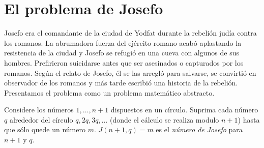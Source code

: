 
\section{El problema de Josefo}\label{s.josephus}

Josefo era el comandante de la ciudad de Yodfat durante la rebelión judía contra los romanos. La abrumadora fuerza del ejército romano acabó aplastando la resistencia de la ciudad y Josefo se refugió en una cueva con algunos de sus hombres. Prefirieron suicidarse antes que ser asesinados o capturados por los romanos. Según el relato de Josefo, él se las arregló para salvarse, se convirtió en observador de los romanos y más tarde escribió una historia de la rebelión. Presentamos el problema como un problema matemático abstracto.

\begin{definition}
Considere los números $1,\ldots,n\!+\!1$ dispuestos en un círculo. Suprima cada número $q$ alrededor del círculo $q, 2q, 3q, \ldots$ (donde el cálculo se realiza modulo $n\!+\!1$) hasta que sólo quede un número $m$. $J(n+1,q)=m$ es el \emph{número de Josefo} para $n+1$ y $q$.
\end{definition}

